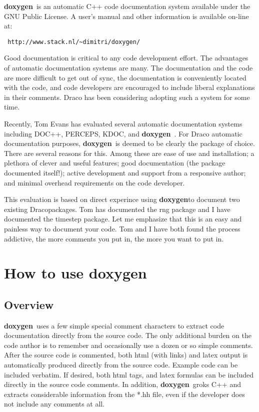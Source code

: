 \documentclass[11pt]{nmemo}
\newcommand{\draco}{{\normalfont\sffamily Draco}}
\newcommand{\doxy}{{\normalfont\bfseries doxygen}}
\begin{document}
\doxy\ is an automatic C++ code documentation system available under
the GNU Public License. 
 A user's manual and other information is available on-line at:
\begin{verbatim} http://www.stack.nl/~dimitri/doxygen/ \end{verbatim}

Good documentation is critical to any code development effort.
The advantages of automatic documentation systems are many. 
The documentation  and the code are more difficult to get out of sync, 
the documentation is conveniently located with the code, and
code developers are encouraged
to include liberal explanations in their comments.
Draco has been considering adopting such a system for some time.


Recently, Tom Evans has evaluated several automatic documentation systems
including DOC++, PERCEPS, KDOC, and \doxy\ . 
For Draco automatic documentation purposes, \doxy\ is deemed to be clearly the 
package of choice. There are several reasons for this. Among these are
ease of use and installation; a plethora of clever and useful features;
good documentation (the package documented itself!);
active development and support from a responsive author; and 
minimal overhead requirements on the code developer.


This evaluation is based on direct experince using \doxy to document
two existing \draco packages.
Tom has documented the rng package and I have documented the timestep
package.
Let me emphasize that this is an easy and painless way to document your
code. Tom and I have both found the process addictive, the more comments
you put in, the more you want to put in.

\section{How to use \doxy\ }

\subsection{Overview}
\doxy\ uses a few simple special comment characters to extract code
documentation directly from the source code. The only additional burden
on the code author is to remember and occasionally use a dozen or so
simple comments. After the source code is commented, both html (with links)
and latex output is automatically produced directly from the source code.
Example code can be included verbatim. If desired, both  html tags, and latex
formulas can be included directly in the source code comments. In addition,
\doxy\ groks C++ and extracts considerable information from the *.hh
file, even if the developer does not include any comments at all.
\end{document}
